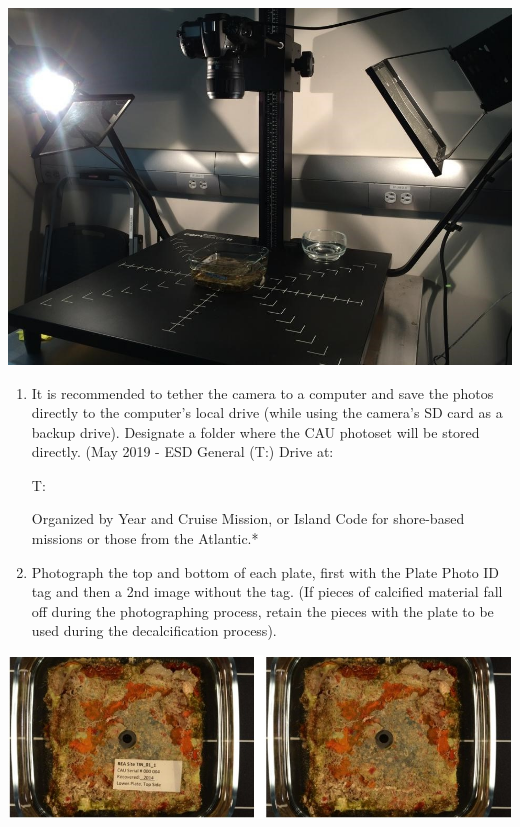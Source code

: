 \documentclass[]{book}
\begin{document}
\includegraphics{images/CAU_photograph.jpg}

\begin{enumerate}
\def\labelenumi{\arabic{enumi}.}
\setcounter{enumi}{6}
\item
  It is recommended to tether the camera to a computer and save the photos directly to the computer's local drive (while using the camera's SD card as a backup drive). Designate a folder where the CAU photoset will be stored directly. (May 2019 - ESD General (T:) Drive at:

  T:\Oceanography\CAUs\Analysis

  Organized by Year and Cruise Mission, or Island Code for shore-based missions or those from the Atlantic.*
\item
  Photograph the top and bottom of each plate, first with the Plate Photo ID tag and then a 2nd image without the tag. (If pieces of calcified material fall off during the photographing process, retain the pieces with the plate to be used during the decalcification process).
\end{enumerate}

\includegraphics{images/CAU_image.jpg}
\end{document}
